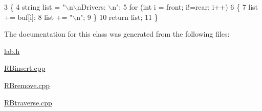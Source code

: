\begin{DoxyCode}
3 \{
4     \textcolor{keywordtype}{string} list = \textcolor{stringliteral}{"\(\backslash\)n\(\backslash\)nDrivers: \(\backslash\)n"};
5     \textcolor{keywordflow}{for} (\textcolor{keywordtype}{int} i = front; i!=rear; i++)
6     \{
7         list += buf[i];
8         list += \textcolor{stringliteral}{"\(\backslash\)n"};
9     \}
10     \textcolor{keywordflow}{return} list;
11 \}
\end{DoxyCode}


The documentation for this class was generated from the following files\+:\begin{DoxyCompactItemize}
\item 
\hyperlink{lab_8h}{lab.\+h}\item 
\hyperlink{RBinsert_8cpp}{R\+Binsert.\+cpp}\item 
\hyperlink{RBremove_8cpp}{R\+Bremove.\+cpp}\item 
\hyperlink{RBtraverse_8cpp}{R\+Btraverse.\+cpp}\end{DoxyCompactItemize}
